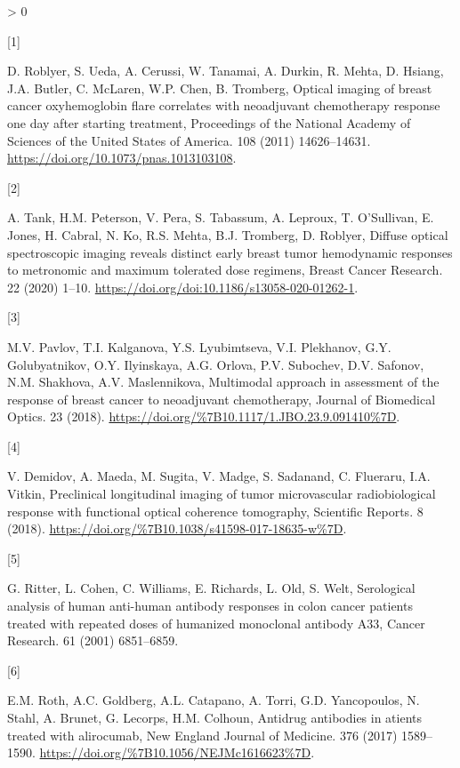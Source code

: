 \documentclass[
]{article}
\newlength{\cslhangindent}
\newlength{\csllabelwidth}
\newenvironment{CSLReferences}[2] %
 {%
  \setlength{\parindent}{0pt}
  \ifodd #1 \everypar{\setlength{\hangindent}{\cslhangindent}}\ignorespaces\fi
  \ifnum #2 > 0
  \setlength{\parskip}{#2\baselineskip}
  \fi
 }%
 {}
\newcommand{\CSLLeftMargin}[1]{\parbox[t]{\csllabelwidth}{#1}}
\newcommand{\CSLRightInline}[1]{\parbox[t]{\linewidth - \csllabelwidth}{#1}\break}
\begin{document}
\hypertarget{refs}{}
\begin{CSLReferences}{0}{0}
\leavevmode\hypertarget{ref-roblyer2011}{}%
\CSLLeftMargin{{[}1{]} }
\CSLRightInline{D. Roblyer, S. Ueda, A. Cerussi, W. Tanamai, A. Durkin, R. Mehta, D. Hsiang, J.A. Butler, C. McLaren, W.P. Chen, B. Tromberg, Optical imaging of breast cancer oxyhemoglobin flare correlates with neoadjuvant chemotherapy response one day after starting treatment, Proceedings of the National Academy of Sciences of the United States of America. 108 (2011) 14626--14631. \url{https://doi.org/10.1073/pnas.1013103108}.}

\leavevmode\hypertarget{ref-tank2020}{}%
\CSLLeftMargin{{[}2{]} }
\CSLRightInline{A. Tank, H.M. Peterson, V. Pera, S. Tabassum, A. Leproux, T. O'Sullivan, E. Jones, H. Cabral, N. Ko, R.S. Mehta, B.J. Tromberg, D. Roblyer, Diffuse optical spectroscopic imaging reveals distinct early breast tumor hemodynamic responses to metronomic and maximum tolerated dose regimens, Breast Cancer Research. 22 (2020) 1--10. \url{https://doi.org/doi:10.1186/s13058-020-01262-1}.}

\leavevmode\hypertarget{ref-pavlov2018}{}%
\CSLLeftMargin{{[}3{]} }
\CSLRightInline{M.V. Pavlov, T.I. Kalganova, Y.S. Lyubimtseva, V.I. Plekhanov, G.Y. Golubyatnikov, O.Y. Ilyinskaya, A.G. Orlova, P.V. Subochev, D.V. Safonov, N.M. Shakhova, A.V. Maslennikova, {Multimodal approach in assessment of the response of breast cancer to neoadjuvant chemotherapy}, {Journal of Biomedical Optics}. {23} (2018). \url{https://doi.org/\%7B10.1117/1.JBO.23.9.091410\%7D}.}

\leavevmode\hypertarget{ref-demidov2018}{}%
\CSLLeftMargin{{[}4{]} }
\CSLRightInline{V. Demidov, A. Maeda, M. Sugita, V. Madge, S. Sadanand, C. Flueraru, I.A. Vitkin, {Preclinical longitudinal imaging of tumor microvascular radiobiological response with functional optical coherence tomography}, {Scientific Reports}. {8} (2018). \url{https://doi.org/\%7B10.1038/s41598-017-18635-w\%7D}.}

\leavevmode\hypertarget{ref-ritter2001}{}%
\CSLLeftMargin{{[}5{]} }
\CSLRightInline{G. Ritter, L. Cohen, C. Williams, E. Richards, L. Old, S. Welt, {Serological analysis of human anti-human antibody responses in colon cancer patients treated with repeated doses of humanized monoclonal antibody A33}, {Cancer Research}. {61} (2001) 6851--6859.}

\leavevmode\hypertarget{ref-roth2017}{}%
\CSLLeftMargin{{[}6{]} }
\CSLRightInline{E.M. Roth, A.C. Goldberg, A.L. Catapano, A. Torri, G.D. Yancopoulos, N. Stahl, A. Brunet, G. Lecorps, H.M. Colhoun, {Antidrug antibodies in atients treated with alirocumab}, {New England Journal of Medicine}. {376} (2017) 1589--1590. \url{https://doi.org/\%7B10.1056/NEJMc1616623\%7D}.}


\end{CSLReferences}
\end{document}
